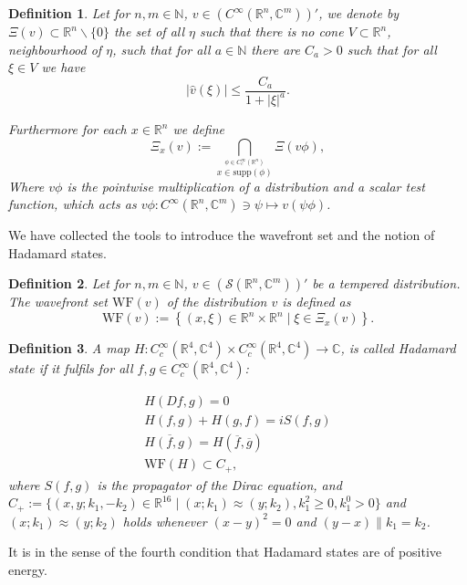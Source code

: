 \documentclass[b5paper,draft,openbib,12pt]{memoir}
\newtheorem{Def}{Definition}
\begin{document}
\begin{Def}
Let for \(n,m\in\mathbb{N}\),  \(v\in (C^\infty(\mathbb{R}^n,\mathbb{C}^m))'\), we denote by \(\Xi(v)\subset \mathbb{R}^n\backslash\{0\}\) the set of all \(\eta\) such that there is no
cone \(V\subset \mathbb{R}^n\), neighbourhood of \(\eta\), such that for all \(a\in\mathbb{N}\) there are \(C_a>0\) such that for all \(\xi\in V\) we have
\begin{equation}
|\hat{v}(\xi)|\le \frac{C_a}{1+|\xi|^a}.
\end{equation}

Furthermore for each \(x\in \mathbb{R}^n\) we define 
\begin{equation}
\Xi_x (v) := \bigcap_{\overset{\phi \in C^\infty_c (\mathbb{R}^n)}{x\in \mathrm{supp}(\phi)}} \Xi(v \phi),
\end{equation}
Where \(v\phi\) is the pointwise multiplication of a distribution and a scalar test function, which acts as \(v\phi: C^\infty(\mathbb{R}^n,\mathbb{C}^m)\ni \psi\mapsto v(\psi \phi)\). 
\end{Def}

We have collected the tools to introduce the wavefront set and the notion of Hadamard states.

\begin{Def}
Let for \(n,m\in\mathbb{N}\), \(v\in (\mathcal{S}(\mathbb{R}^n,\mathbb{C}^m))'\) be a tempered distribution. The wavefront set \(\mathrm{WF}(v)\) of 
the distribution \(v\) is defined as 
\begin{equation}
\mathrm{WF}(v):= \left\{(x,\xi)\in \mathbb{R}^n\times \mathbb{R}^n\mid \xi \in \Xi_x(v) \right\}.
\end{equation}
\end{Def}

\begin{Def}\label{def: hadamard}
A map \(H: C_c^\infty(\mathbb{R}^4,\mathbb{C}^4)\times C_c^\infty(\mathbb{R}^4,\mathbb{C}^4) \rightarrow \mathbb{C}\), is called Hadamard state if it fulfils
for all \( f,g\in C_c^\infty(\mathbb{R}^4,\mathbb{C}^4)\):

\begin{align}
H(Df,g)=0\\
H(f,g)+H(g,f)=i S(f,g)\\
\overline{H(f,g)}=H(\overline{f},\overline{g})\\
\text{WF}(H)\subset C_+,
\end{align}
where \(S(f,g)\) is the propagator of the Dirac equation, 
  and  \(C_+:=\{(x,y;k_1,-k_2)\in\mathbb{R}^{16}\mid (x;k_1)\approx (y;k_2) , k_1^2\ge0, k_1^0>0\}\)
and \((x;k_1)\approx(y;k_2)\) holds whenever \((x-y)^2=0\) and \((y-x)\parallel k_1 = k_2\).
\end{Def}
It is in the sense of the fourth condition that Hadamard states are of positive energy.
\end{document}
